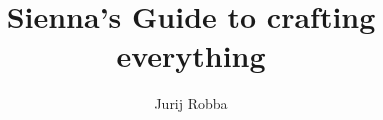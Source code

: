 \documentclass[12pt,a4paper]{report}
\begin{document}
\begin{titlepage}

\title{Sienna's Guide to crafting everything}
\author{Jurij Robba}

\maketitle

\end{titlepage}



\tableofcontents


























\end{document}
